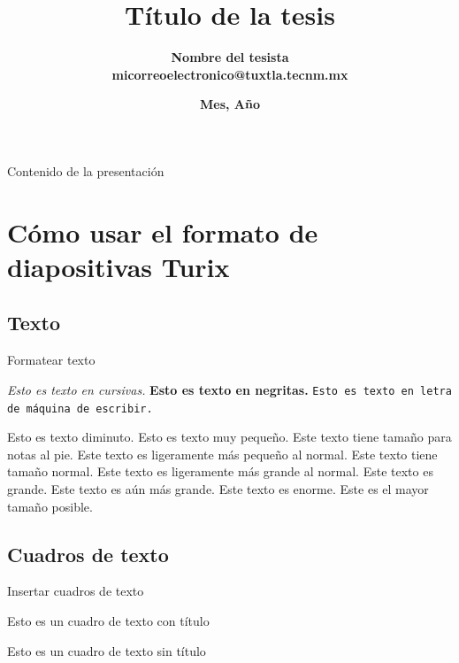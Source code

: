 \documentclass[aspectratio=169]{beamer} %
\title[\textbf{Título de la tesis}]{\textbf{Título de la tesis}}
\author[\textbf{Nombre del tesista}]{\textbf{Nombre del tesista \\ micorreoelectronico@tuxtla.tecnm.mx}}
\date{\textbf{Mes, Año}}
\begin{document}
\begin{frame}
    \maketitle
\end{frame}

\begin{frame}{Contenido de la presentación}
    \tableofcontents
\end{frame}

\section{Cómo usar el formato de diapositivas Turix}

\subsection{Texto}

\begin{frame}{Formatear texto}

\textit{Esto es texto en cursivas.} \textbf{Esto es texto en negritas.} \texttt{Esto es texto en letra de máquina de escribir.}

\tiny{Esto es texto diminuto.}
\scriptsize{Esto es texto muy pequeño.}
\footnotesize{Este texto tiene tamaño para notas al pie.}
\small{Este texto es ligeramente más pequeño al normal.}
\normalsize{Este texto tiene tamaño normal.}
\large{Este texto es ligeramente más grande al normal.}
\Large{Este texto es grande.}
\LARGE{Este texto es aún más grande.}
\huge{Este texto es enorme.}
\Huge{Este es el mayor tamaño posible.}

\end{frame}

\subsection{Cuadros de texto}

\begin{frame}{Insertar cuadros de texto}
    \begin{tcolorbox}[colback=backframe_color,colframe=beamer_color,title=Este es el título del cuadro de texto]
    Esto es un cuadro de texto con título
    \end{tcolorbox}

    \begin{tcolorbox}[colback=backframe_color,colframe=beamer_color]
    Esto es un cuadro de texto sin título
    \end{tcolorbox}
\end{frame}
\end{document}
